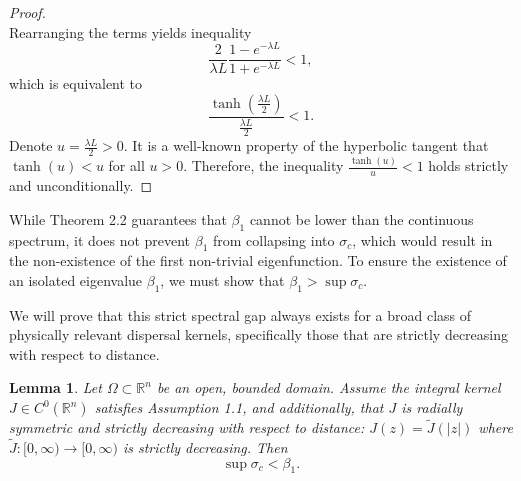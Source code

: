 \documentclass[11pt, a4paper]{article}
\theoremstyle{break}
\theoremstyle{break}
\theoremstyle{break}
\theoremstyle{break}
\theoremstyle{break}
\newtheorem{lem}{Lemma}[section]
\theoremstyle{break}
\theoremstyle{break}
\theoremstyle{break}
\theoremstyle{break}
\begin{document}
\begin{proof}
\begin{equation}
    \end{equation}
    Rearranging the terms yields inequality
    \begin{equation}
        \frac{2}{\lambda L} \frac{1 - e^{-\lambda L}}{1 + e^{-\lambda L}} < 1,
    \end{equation}
    which is equivalent to
    \begin{equation}
        \frac{\tanh\left(\frac{\lambda L}{2}\right)}{\frac{\lambda L}{2}} < 1.
    \end{equation}
    Denote $u = \frac{\lambda L}{2} > 0$. It is a well-known property of the hyperbolic tangent that $\tanh(u) < u$ for all $u > 0$. Therefore, the inequality $\frac{\tanh(u)}{u} < 1$ holds strictly and unconditionally.
\end{proof}


While Theorem 2.2 guarantees that $\beta_1$ cannot be lower than the continuous spectrum, it does not prevent $\beta_1$ from collapsing into $\sigma_c$, which would result in the non-existence of the first non-trivial eigenfunction. To ensure the existence of an isolated eigenvalue $\beta_1$, we must show that $\beta_1 > \sup \sigma_c$. 

We will prove that this strict spectral gap always exists for a broad class of physically relevant dispersal kernels, specifically those that are strictly decreasing with respect to distance.

\begin{lem}
    \label{lem:spectral_gap_decreasing}
    Let $\Omega \subset \mathbb{R}^n$ be an open, bounded domain. Assume the integral kernel $J \in C^0(\mathbb{R}^n)$ satisfies Assumption 1.1, and additionally, that $J$ is radially symmetric and strictly decreasing with respect to distance: $J(z) = \tilde{J}(|z|)$ where $\tilde{J}: [0, \infty) \to [0, \infty)$ is strictly decreasing. Then
    \begin{equation}
        \sup \sigma_c < \beta_1.
    \end{equation}
\end{lem}
\end{document}
